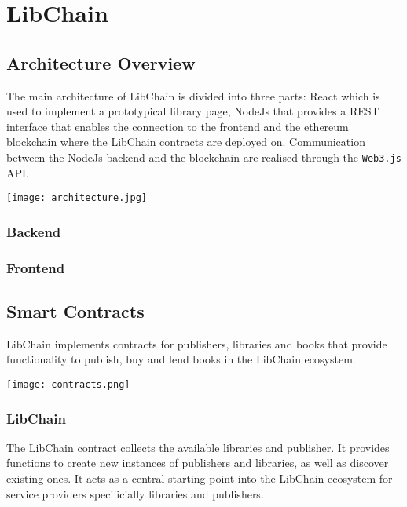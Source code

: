 \chapter{LibChain}
\section{Architecture Overview}
The main architecture of LibChain is divided into three parts: React which is used to implement a prototypical library page, NodeJs that provides a REST interface that enables the connection to the frontend and the ethereum blockchain where the LibChain contracts are deployed on. Communication between the NodeJs backend and the blockchain are realised through the \texttt{Web3.js} API.

\vspace{0.3cm}
\texttt{[image: architecture.jpg]}
\subsection{Backend}


\subsection{Frontend}


\section{Smart Contracts}
LibChain implements contracts for publishers, libraries and books that provide functionality to publish, buy and lend books in the LibChain ecosystem.

\vspace{0.3cm}
\texttt{[image: contracts.png]}

\subsection{LibChain}
The LibChain contract collects the available libraries and publisher. It provides functions to create new instances of publishers and libraries, as well as discover existing ones. It acts as a central starting point into the LibChain ecosystem for service providers specificially libraries and publishers.

